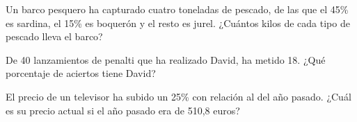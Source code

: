 \documentclass[addpoints,spanish, 12pt,a4paper]{exam}
\renewcommand*\half{.5}
\begin{document}
\begin{questions}
\question[1\half] Un barco pesquero ha capturado cuatro toneladas de pescado, de las que el 45\% es sardina, el 15\% es boquerón y el resto es jurel. ¿Cuántos kilos de cada tipo de pescado lleva el barco?

\vspace{3cm}

\question[1] De 40 lanzamientos de penalti que ha realizado David, ha metido 18. ¿Qué porcentaje de aciertos tiene David?

\vspace{3cm}

\question[1\half] El precio de un televisor ha subido un 25\% con relación al del año pasado. ¿Cuál es su precio actual si el año pasado era de 510,8 euros?

\vspace{3cm}

\end{questions}
\end{document}
